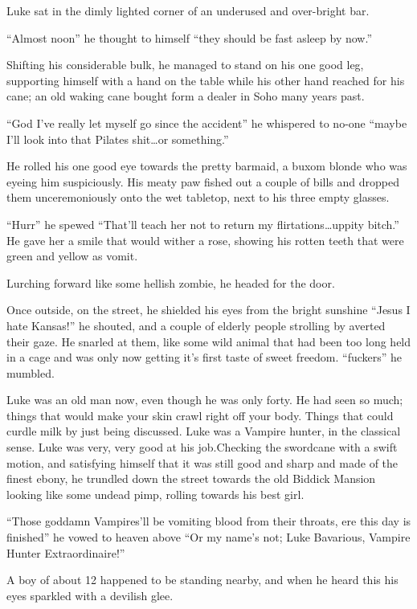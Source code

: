 Luke sat in the dimly lighted corner of an underused and
over-bright bar.

``Almost noon'' he thought to himself ``they should be fast asleep by
now.''

Shifting his considerable bulk, he managed to stand on his one good
leg, supporting himself with a hand on the table while his other
hand reached for his cane; an old waking cane bought form a dealer
in Soho many years past.

``God I've really let myself go since the accident'' he whispered to
no-one ``maybe I'll look into that Pilates shit{\ldots}or
something.''

He rolled his one good eye towards the pretty barmaid, a buxom
blonde who was eyeing him suspiciously. His meaty paw fished out a
couple of bills and dropped them unceremoniously onto the wet
tabletop, next to his three empty glasses.

``Hurr'' he spewed ``That'll teach her not to return my
flirtations{\ldots}uppity bitch.'' He gave her a smile that would wither
a rose, showing his rotten teeth that were green and yellow as
vomit.

Lurching forward like some hellish zombie, he headed for the
door.

Once outside, on the street, he shielded his eyes from the bright
sunshine ``Jesus I hate Kansas!'' he shouted, and a couple of elderly
people strolling by averted their gaze. He snarled at them, like
some wild animal that had been too long held in a cage and was only
now getting it's first taste of sweet freedom. ``fuckers'' he
mumbled.

Luke was an old man now, even though he was only forty. He had seen
so much; things that would make your skin crawl right off your
body. Things that could curdle milk by just being discussed. Luke
was a Vampire hunter, in the classical sense. Luke was very, very
good at his job.Checking the swordcane with a swift motion, and
satisfying himself that it was still good and sharp and made of the
finest ebony, he trundled down the street towards the old Biddick
Mansion looking like some undead pimp, rolling towards his best
girl.

``Those goddamn Vampires'll be vomiting blood from their throats,
ere this day is finished'' he vowed to heaven above ``Or my name's
not; Luke Bavarious, Vampire Hunter Extraordinaire!''

A boy of about 12 happened to be standing nearby, and when he heard
this his eyes sparkled with a devilish glee.

